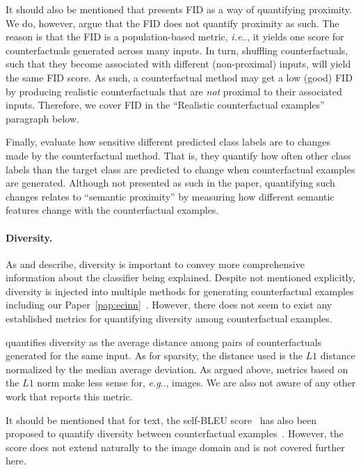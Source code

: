 \documentclass[11pt,a4paper,twoside,openright,final]{memoir}
\makeatletter
\DeclareRobustCommand\onedot{\futurelet\@let@token\@onedot}
\def\@onedot{\ifx\@let@token.\else.\null\fi\xspace}
\def\eg{\emph{e.g}\onedot} \def\Eg{\emph{E.g}\onedot}
\def\ie{\emph{i.e}\onedot} \def\Ie{\emph{I.e}\onedot}
\newcommand*{\paperref}[1]{Paper~\hyperref[#1]{\ref{#1}}}
\makeatother
\begin{document}
It should also be mentioned that \cite{Rodriguez2021} presents FID as a way of quantifying proximity.
We do, however, argue that the FID does not quantify proximity as such.
The reason is that the FID is a population-based metric, \ie, it yields one score for counterfactuals generated across many inputs.
In turn, shuffling counterfactuals, such that they become associated with different (non-proximal) inputs, will yield the same FID score.
As such, a counterfactual method may get a low (good) FID by producing realistic counterfactuals that are \emph{not} proximal to their associated inputs.
Therefore, we cover FID in the ``Realistic counterfactual examples'' paragraph below. 

Finally, \citet{Singla2019} evaluate how sensitive different predicted class labels are to changes made by the counterfactual method. 
That is, they quantify how often other class labels than the target class are predicted to change when counterfactual examples are generated. 
Although not presented as such in the paper, quantifying such changes relates to ``semantic proximity'' by measuring how different semantic features change with the counterfactual examples. 

\paragraph{Diversity.}
As \citet{Mothilal2020} and \citet{Wachter2017} describe, diversity is important to convey more comprehensive information about the classifier being explained.
Despite not mentioned explicitly, diversity is injected into multiple methods for generating counterfactual examples including our \paperref{pap:ecinn}~\cite{Joshi2018, Singla2019, Rodriguez2021}. 
However, there does not seem to exist any established metrics for quantifying diversity among counterfactual examples.

\cite{Mothilal2020} quantifies diversity as the average distance among pairs of counterfactuals generated for the same input. 
As for sparsity, the distance used is the $L1$ distance normalized by the median average deviation.
As argued above, metrics based on the $L1$ norm make less sense for, \eg, images.
We are also not aware of any other work that reports this metric.

It should be mentioned that for text, the self-BLEU score~\cite{self-bleu} has also been proposed to quantify diversity between counterfactual examples~\cite{Wu2021}.
However, the score does not extend naturally to the image domain and is not covered further here.
\end{document}

